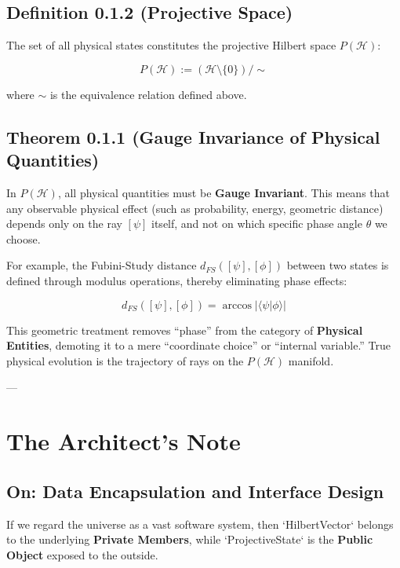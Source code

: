 \subsection{Definition 0.1.2 (Projective Space)}

The set of all physical states constitutes the projective Hilbert space $P(\mathcal{H})$:

$$P(\mathcal{H}) := (\mathcal{H} \setminus \{0\}) / \sim$$

where $\sim$ is the equivalence relation defined above.

\subsection{Theorem 0.1.1 (Gauge Invariance of Physical Quantities)}

In $P(\mathcal{H})$, all physical quantities must be \textbf{Gauge Invariant}. This means that any observable physical effect (such as probability, energy, geometric distance) depends only on the ray $[\psi]$ itself, and not on which specific phase angle $\theta$ we choose.

For example, the Fubini-Study distance $d_{FS}([\psi], [\phi])$ between two states is defined through modulus operations, thereby eliminating phase effects:

$$d_{FS}([\psi], [\phi]) = \arccos |\langle \psi | \phi \rangle|$$

This geometric treatment removes ``phase'' from the category of \textbf{Physical Entities}, demoting it to a mere ``coordinate choice'' or ``internal variable.'' True physical evolution is the trajectory of rays on the $P(\mathcal{H})$ manifold.

---

\section{The Architect's Note}

\subsection{On: Data Encapsulation and Interface Design}

If we regard the universe as a vast software system, then `HilbertVector` belongs to the underlying \textbf{Private Members}, while `ProjectiveState` is the \textbf{Public Object} exposed to the outside.

